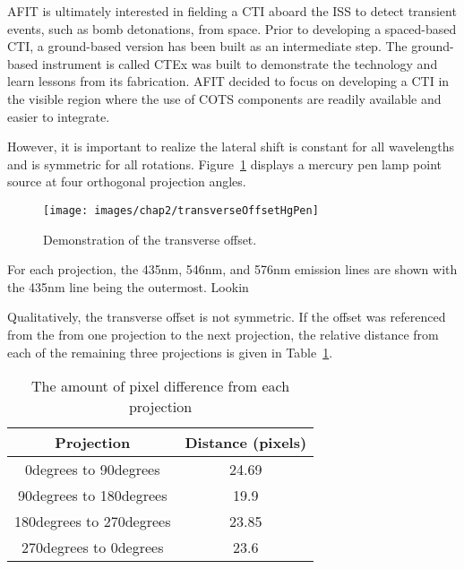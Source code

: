 \ac{AFIT} is ultimately interested in fielding a \ac{CTI} aboard the \ac{ISS} to detect transient events, such as bomb detonations, from space. Prior to developing a spaced-based \ac{CTI}, a ground-based version has been built as an intermediate step. The ground-based instrument is called \ac{CTEx} was built to demonstrate the technology and learn lessons from its fabrication. \ac{AFIT} decided to focus on developing a \ac{CTI} in the visible region where the use of \ac{COTS} components are readily available and easier to integrate. 


However, it is important to realize the lateral shift is constant for all wavelengths and is symmetric for all rotations. Figure~\ref{fig:transverseOffsetHgPen} displays a mercury pen lamp point source at four orthogonal projection angles.

\begin{figure}[htb]
\begin{center}
\texttt{[image: images/chap2/transverseOffsetHgPen]}
\caption{Demonstration of the transverse offset.}
\label{fig:transverseOffsetHgPen}
\end{center}
\end{figure}

For each projection, the 435nm, 546nm, and 576nm emission lines are shown with the 435nm line being the outermost. Lookin


Qualitatively, the transverse offset is not symmetric. If the offset was referenced from the from one projection to the next projection, the relative distance from each of the remaining three projections is given in Table~\ref{tbl:offsetDistances}.

\begin{table}[htb] 
\label{tbl:offsetDistances} %
\caption{The amount of pixel difference from each projection} %
\centering %
\begin{tabular}{ c c } %
\hline
Projection & Distance (pixels) \\  %
\hline %
0degrees to 90degrees & 24.69\\
90degrees to 180degrees & 19.9 \\
180degrees to 270degrees & 23.85 \\
270degrees to 0degrees & 23.6 \\
\hline %
\end{tabular} 
\end{table}

